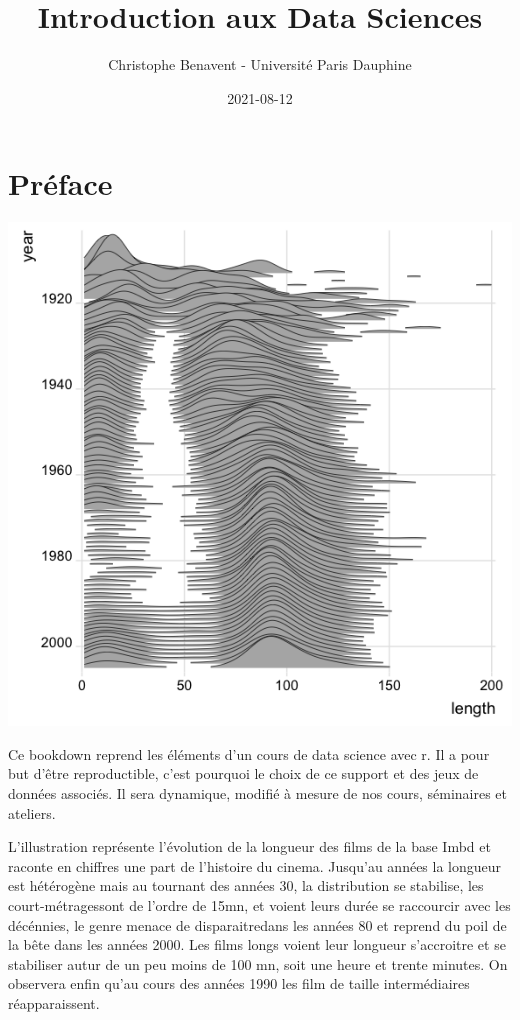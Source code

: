 \documentclass[
]{book}
\title{Introduction aux Data Sciences}
\author{Christophe Benavent - Université Paris Dauphine}
\date{2021-08-12}
\begin{document}
\maketitle

{
\setcounter{tocdepth}{1}
\tableofcontents
}
\hypertarget{pruxe9face}{%
\chapter{Préface}\label{pruxe9face}}

\includegraphics{./Images/ggridge.png}

Ce bookdown reprend les éléments d'un cours de data science avec r. Il a pour but d'être reproductible, c'est pourquoi le choix de ce support et des jeux de données associés. Il sera dynamique, modifié à mesure de nos cours, séminaires et ateliers.

L'illustration représente l'évolution de la longueur des films de la base Imbd et raconte en chiffres une part de l'histoire du cinema. Jusqu'au années la longueur est hétérogène mais au tournant des années 30, la distribution se stabilise, les court-métragessont de l'ordre de 15mn, et voient leurs durée se raccourcir avec les décénnies, le genre menace de disparaitredans les années 80 et reprend du poil de la bête dans les années 2000. Les films longs voient leur longueur s'accroitre et se stabiliser autur de un peu moins de 100 mn, soit une heure et trente minutes. On observera enfin qu'au cours des années 1990 les film de taille intermédiaires réapparaissent.
\end{document}
